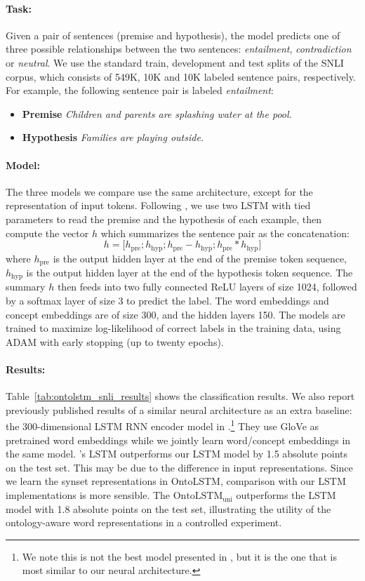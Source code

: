 \paragraph{Task:}
Given a pair of sentences (premise and hypothesis), the model predicts one of three possible relationships between the two sentences: \textit{entailment}, \textit{contradiction} or \textit{neutral}.
We use the standard train, development and test splits of the SNLI corpus, which consists of 549K, 10K and 10K labeled sentence pairs, respectively.
For example, the following sentence pair is labeled \textit{entailment}:
 \begin{itemize}
  \item \textbf{Premise} \textit{Children and parents are splashing water at the pool.}
  \item \textbf{Hypothesis} \textit{Families are playing outside.}
 \end{itemize}
\paragraph{Model:}
The three models we compare use the same architecture, except for the representation of input tokens.
Following \cite{mou2015recognizing}, we use two LSTM with tied parameters to read the premise and the hypothesis of each example, then compute the vector $h$ which summarizes the sentence pair as the concatenation:
$$h=\big[h_{\text{pre}}; h_{\text{hyp}}; h_{\text{pre}} -h_{\text{hyp}};h_{\text{pre}} *h_{\text{hyp}}\big]$$
where $h_\text{pre}$ is the output hidden layer at the end of the premise token sequence, $h_\text{hyp}$ is the output hidden layer at the end of the hypothesis token sequence.
The summary $h$ then feeds into two fully connected ReLU layers of size 1024, followed by a softmax layer of size 3 to predict the label.
The word embeddings and concept embeddings are of size 300, and the hidden layers 150.
The models are trained to maximize log-likelihood of correct labels in the training data, using ADAM \citep{kingma2014adam} with early stopping (up to twenty epochs).

\paragraph{Results:}
Table~\ref{tab:ontolstm_snli_results} shows the classification results. We also report previously published results of a similar neural architecture as an extra baseline: the 300-dimensional LSTM RNN encoder model in \cite{bowman2016fast}.\footnote{We note this is not the best model presented in \cite{bowman2016fast}, but it is the one that is most similar to our neural architecture.}
They use GloVe as pretrained word embeddings while we jointly learn word/concept embeddings in the same model.
\cite{bowman2016fast}'s LSTM outperforms our LSTM model by 1.5 absolute points on the test set. This may be due to the difference in input representations. Since we learn the synset representations in OntoLSTM, comparison with our LSTM implementations is more sensible.
The $\text{OntoLSTM}_{\text{uni}}$ outperforms the LSTM model with 1.8 absolute points on the test set, illustrating the utility of the ontology-aware word representations in a controlled experiment.

